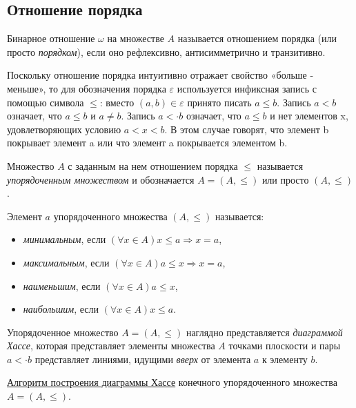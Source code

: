 \documentclass[bachelor, och, labwork]{shiza}
\begin{document}
	

    \subsection{Отношение порядка}
	

	Бинарное отношение $\omega $ на множестве $A$ называется отношением порядка (или просто \textit{порядком}), если оно рефлексивно, антисимметрично и транзитивно.
	
	Поскольку отношение порядка интуитивно отражает свойство «больше - меньше», то для обозначения порядка $\varepsilon$ используется инфиксная запись с помощью символа $\leq$: вместо $ (a, b) \in \varepsilon$ принято писать $a \leq b$.
	Запись $a < b$ означает, что $a \leq b$ и $a \neq b$.
	Запись $a <\cdot b$ означает, что $a \leq b$ и нет элементов x, удовлетворяющих условию $a < x < b$. В этом случае говорят, что элемент b покрывает элемент a или что элемент a покрывается элементом b.
	
	
	Множество $A$ с заданным на нем отношением порядка $\leq$ называется \textit{упорядоченным множеством} и обозначается $A = (A,\leq)$ или просто $(A,\leq)$.
	
	Элемент $a$ упорядоченного множества $(A,\leq)$ называется:

	\begin{itemize}
		\item \textit{минимальным}, если $(\forall x \in A) x \leq a \Rightarrow x = a$,
		\item \textit{максимальным}, если $(\forall x \in A) a \leq x \Rightarrow x = a$,
		\item \textit{наименьшим}, если $(\forall x \in A) a \leq x$,
		\item \textit{наибольшим}, если $(\forall x \in A) x \leq a$.
	\end{itemize}

	Упорядоченное множество $A = (A,\leq)$	наглядно представляется \textit{диаграммой Хассе}, которая представляет элементы множества $A$ точками плоскости и пары $a <\cdot b$ представляет линиями, идущими \textit{вверх} от элемента $a$ к элементу $b$.
		
	\underline{Алгоритм построения диаграммы Хассе} конечного упорядоченного множества $A = (A,\leq)$.
	
\end{document}
